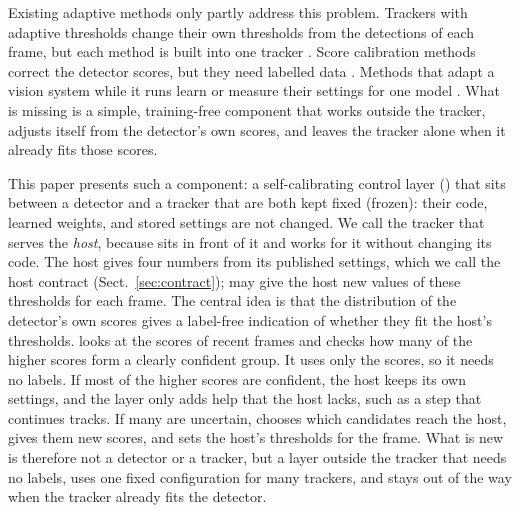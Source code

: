 Existing adaptive methods only partly address this problem. Trackers with adaptive thresholds
change their own thresholds from the detections of each frame, but each method is built into one
tracker \cite{ma2023adaptivebytetrack,shim2024adaptrack,act2026adaptive}. Score calibration methods
correct the detector scores, but they need labelled data \cite{kuppers2020detcalib}. Methods that
adapt a vision system while it runs learn or measure their settings for one model
\cite{han2022dynamic,jiang2018chameleon}. What is missing is a simple, training-free component that
works outside the tracker, adjusts itself from the detector's own scores, and leaves the tracker
alone when it already fits those scores.

This paper presents such a component: a self-calibrating control layer (\scl{}) that sits between
a detector and a tracker that are both kept fixed (frozen): their code, learned weights, and stored
settings are not changed. We call the tracker that \scl{} serves the \emph{host}, because \scl{}
sits in front of it and works for it without changing its code. The host gives \scl{} four numbers
from its published settings, which we call the host contract (Sect.~\ref{sec:contract}); \scl{}
may give the host new values of these thresholds for each frame. The central idea is that the
distribution of the detector's own scores gives a label-free indication of whether they fit the
host's thresholds. \scl{} looks at the scores of recent frames and checks how many of the higher
scores form a clearly confident group. It uses only the scores, so it needs no labels. If most of
the higher
scores are confident, the host keeps its own settings, and the layer only adds help that the host
lacks, such as a step that continues tracks. If many are uncertain, \scl{} chooses which candidates
reach the host, gives them new scores, and sets the host's thresholds for the frame. What is new is therefore not
a detector or a tracker, but a layer outside the tracker that needs no labels, uses one fixed
configuration for many trackers, and stays out of the way when the tracker already fits the
detector.



